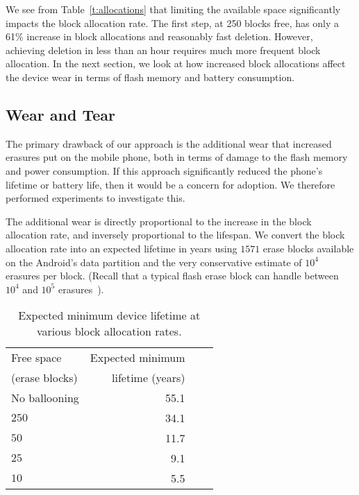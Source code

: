 \documentclass{acmtog}
\begin{document}
We see from Table~\ref{t:allocations} that limiting the available space
significantly impacts the block allocation rate. The first step, at 250 blocks free, has
only a 61\% increase in block allocations and reasonably fast deletion.
However, achieving deletion in less than an hour requires much more
frequent block allocation. In the next section, we look at how increased block
allocations affect the device wear in terms of flash memory and
battery consumption.


\subsection{Wear and Tear}

The primary drawback of our approach is the additional wear that
increased erasures put on the mobile phone, both in terms of damage
to the flash memory and power consumption. If this approach
significantly reduced the phone's lifetime or battery life,
then it would be a concern for adoption. We therefore performed experiments to investigate this.

The additional wear is directly proportional to the increase in the block
allocation rate, and inversely proportional to the lifespan. We
convert the block allocation rate into an expected lifetime in years
using $1571$ erase blocks available on the
Android's data partition and the very conservative estimate of $10^4$ erasures per
block. (Recall that a typical flash erase block can
handle between $10^4$ and $10^5$ erasures~\cite{flashlife}).



\begin{table}[t]
\centering
\begin{tabular}{lrrr}
\hline
Free space   & Expected minimum \\
(erase blocks)  & lifetime (years) &  \\
\hline
No ballooning & 55.1 \\ 
$250$ & 34.1  \\
$50$ & 11.7 \\
$25$ & 9.1 \\
$10$ & 5.5 \\

\hline

\end{tabular}

\caption{\small Expected minimum device lifetime at various block allocation rates.
\label{t:life}\normalsize}
\end{table}
\end{document}
